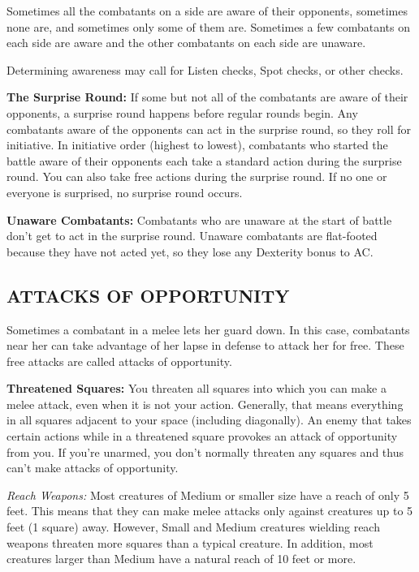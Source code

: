 \documentclass{article}
\begin{document}
Sometimes all the combatants on a side are aware of their opponents, sometimes 
none are, and sometimes only some of them are. Sometimes a few combatants on each 
side are aware and the other combatants on each side are unaware.

Determining awareness may call for Listen checks, Spot checks, or other checks.

\textbf{The Surprise Round:} If some but not all of the combatants are aware of 
their opponents, a surprise round happens before regular rounds begin. Any combatants 
aware of the opponents can act in the surprise round, so they roll for initiative. 
In initiative order (highest to lowest), combatants who started the battle aware 
of their opponents each take a standard action during the surprise round. You can 
also take free actions during the surprise round. If no one or everyone is surprised, 
no surprise round occurs.

\textbf{Unaware Combatants:} Combatants who are unaware at the start of battle 
don't get to act in the surprise round. Unaware combatants are flat-footed because 
they have not acted yet, so they lose any Dexterity bonus to AC.

\vspace{12pt}
\subsection*{{\LARGE{}ATTACKS OF OPPORTUNITY}}

Sometimes a combatant in a melee lets her guard down. In this case, combatants 
near her can take advantage of her lapse in defense to attack her for free. These 
free attacks are called attacks of opportunity.

\textbf{Threatened Squares:} You threaten all squares into which you can make a 
melee attack, even when it is not your action. Generally, that means everything 
in all squares adjacent to your space (including diagonally). An enemy that takes 
certain actions while in a threatened square provokes an attack of opportunity 
from you. If you're unarmed, you don't normally threaten any squares and thus can't 
make attacks of opportunity.

\textit{Reach Weapons: }Most creatures of Medium or smaller size have a reach of 
only 5 feet. This means that they can make melee attacks only against creatures 
up to 5 feet (1 square) away. However, Small and Medium creatures wielding reach 
weapons threaten more squares than a typical creature. In addition, most creatures 
larger than Medium have a natural reach of 10 feet or more.
\end{document}
